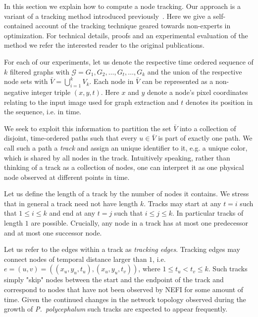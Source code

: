 	      In this section we explain how to compute a node tracking. Our approach is a variant of a tracking method introduced previously~\cite{woll2013novel,Karrenbauer2013}. Here we give a self-contained account of the tracking technique geared towards non-experts in optimization. For technical details, proofs and an experimental evaluation of the method we refer the interested reader to the original publications.

	      For each of our experiments, let us denote the respective time ordered sequence of $k$ filtered graphs with $\mathcal{G} = {G_1, G_2, \dots, G_t, \dots, G_k}$ and the union of the respective node sets with $\bar{V} = \bigcup_{i=1}^{k} V_{k}$. Each node in $\bar{V}$ can be represented as a non-negative integer triple $(x,y,t)$. Here $x$ and $y$ denote a node's pixel coordinates relating to the input image used for graph extraction and $t$ denotes its position in the sequence, i.e. in time.

	      We seek to exploit this information to partition the set $\bar{V}$ into a collection of disjoint, time-ordered paths such that every $u \in \bar{V}$ is part of exactly one path. We call such a path a \emph{track} and assign an unique identifier to it, e.g. a unique color, which is shared by all nodes in the track. Intuitively speaking, rather than thinking of a track as a collection of nodes, one can interpret it as one physical node observed at different points in time.

	      Let us define the length of a track by the number of nodes it contains. We stress that in general a track need not have length $k$. Tracks may start at any $t=i$ such that $1 \le i \le k$ and end at any $t=j$ such that $i \le j \le k$. In particular tracks of length $1$ are possible. Crucially, any node in a track has at most one predecessor and at most one successor node.

	      Let us refer to the edges within a track as \emph{tracking edges}. Tracking edges may connect nodes of temporal distance larger than $1$, i.e. $e = (u,v) = ((x_u,y_u,t_u), (x_u,y_u,t_v))$, where $1 \le t_u < t_v \le k$. Such tracks simply "skip" nodes between the start and the endpoint of the track and correspond to nodes that have not been observed by NEFI for some amount of time. Given the continued changes in the network topology observed during the growth of \emph{P.~polycephalum} such tracks are expected to appear frequently. 

